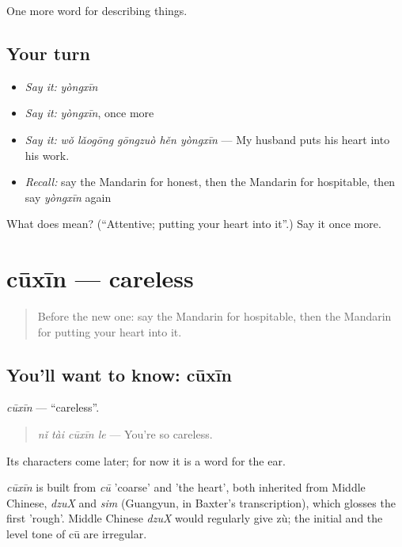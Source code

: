 \begin{grammarlens}[title={What you've built}]
One more word for describing things.
\end{grammarlens}

\subsection*{Your turn}
\begin{itemize}
\raggedright
  \item \emph{Say it:} \emph{yòngxīn}
  \item \emph{Say it:} \emph{yòngxīn}, once more
  \item \emph{Say it:} \emph{wǒ lǎogōng gōngzuò hěn yòngxīn} — My husband puts his heart into his work.
  \item \emph{Recall:} say the Mandarin for honest, then the Mandarin for hospitable, then say \emph{yòngxīn} again
\end{itemize}

\begin{tcolorbox}[breakable,colback=teal!4,colframe=teal!35!black,title={Before you move on}]
What does  mean? (\textquotedblleft{}Attentive; putting your heart into it\textquotedblright{}.) Say it once more.
\end{tcolorbox}
\section[cūxīn]{cūxīn — careless}

\label{lesson:ZH-C273-cuxin}



\begin{quote}
Before the new one: say the Mandarin for hospitable, then the Mandarin for putting your heart into it.
\end{quote}

\subsection*{You'll want to know: cūxīn}
\emph{cūxīn} — \textquotedblleft{}careless\textquotedblright{}.

\begin{quote}
\emph{nǐ tài cūxīn le} — You're so careless.
\end{quote}

Its characters come later; for now it is a word for the ear.

\begin{cousinweb}
\emph{cūxīn} is built from \emph{cū} 'coarse' and  'the heart', both inherited from Middle Chinese, \emph{dzuX} and \emph{sim} (Guangyun, in Baxter's transcription), which glosses the first 'rough'. Middle Chinese \emph{dzuX} would regularly give zù; the initial and the level tone of cū are irregular.
\end{cousinweb}

